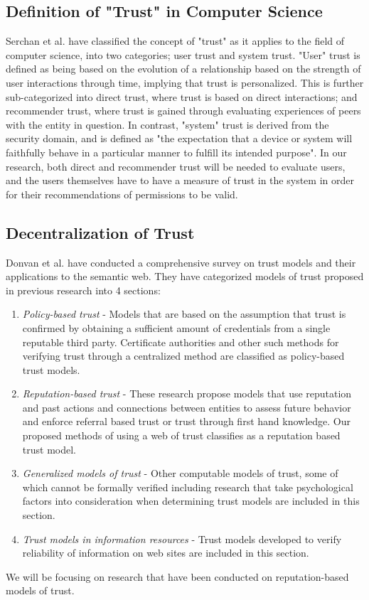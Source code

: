 \subsection{Definition of "Trust" in Computer Science}
Serchan et al. have classified the concept of "trust" as it applies to the field of computer science, into two categories; user trust and system trust\cite{sherchan2013survey}. "User" trust is defined as being based on the evolution of a relationship based on the strength of user interactions through time, implying that trust is personalized. This is further sub-categorized into direct trust, where trust is based on direct interactions; and recommender trust, where trust is gained through evaluating experiences of peers with the entity in question. In contrast, "system" trust is derived from the security domain, and is defined as "the expectation that a device or system will faithfully behave in a particular manner to fulfill its intended purpose". In our research, both direct and recommender trust will be needed to evaluate users, and the users themselves have to have a measure of trust in the system in order for their recommendations of permissions to be valid. 

\subsection{Decentralization of Trust}
Donvan et al. have conducted a comprehensive survey on trust models and their applications to the semantic web\cite{artz2007survey}. They have categorized models of trust proposed in previous research into 4 sections:
\begin{enumerate}
\item \textit{Policy-based trust} - Models that are based on the assumption that trust is confirmed by obtaining a sufficient amount of credentials from a single reputable third party. Certificate authorities and other such methods for verifying trust through a centralized method are classified as policy-based trust models.
\item \textit{Reputation-based trust} - These research propose models that use reputation and past actions and connections between entities to assess future behavior and enforce referral based trust or trust through first hand knowledge. Our proposed methods of  using a web of trust classifies as a reputation based trust model.
\item \textit{Generalized models of trust} - Other computable models of trust, some of which cannot be formally verified including research that take psychological factors into consideration when determining trust models are included in this section.
\item \textit{Trust models in information resources} - Trust models developed to verify reliability of information on web sites are included in this section. 
\end{enumerate}
We will be focusing on research that have been conducted on reputation-based models of trust. 

